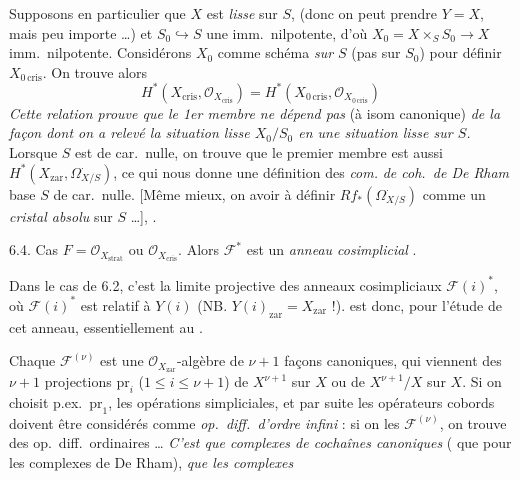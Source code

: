 \documentclass[11pt,a4paper]{article}
\begin{document}

Supposons en particulier que $X$ est \emph{lisse} sur $S$, (donc on peut
prendre $Y = X$, mais peu importe \ldots) et $S_0 \hookrightarrow S$ une
imm.\ nilpotente, d'où $X_0 = X \times_S S_0 \to X$ imm.\ nilpotente.
Considérons $X_0$ comme schéma \emph{sur $S$} (pas sur $S_0$) pour définir
$X_{0\,\mathrm{cris}}$. On trouve alors
\[
  H^{*}(X_{\mathrm{cris}}, \mathcal{O}_{X_{\mathrm{cris}}})
  = H^{*}(X_{0\,\mathrm{cris}}, \mathcal{O}_{X_{0\,\mathrm{cris}}})
\]
\emph{Cette relation prouve que le 1er membre ne dépend pas} (à isom
canonique) \emph{de la façon dont on a relevé la situation lisse
$X_0/S_0$ en une situation lisse sur $S$.} Lorsque $S$ est de car.\ nulle,
on trouve que le premier membre est aussi 
$H^{*}(X_{\mathrm{zar}}, \Omega^{\cdot}_{X/S})$, ce qui nous donne une
définition des \emph{\ill{}} \emph{com.} \emph{de coh.\ de De Rham}
 \struck{\ill{}} base $S$ de
car.\ nulle. [Même mieux, on \struck{\ill{}} \ill{} avoir à définir
$Rf_{*}(\Omega^{\cdot}_{X/S})$ comme un \emph{cristal absolu} sur $S$
\ldots], \add{\uncertain{donc} l'étendre à \emph{tt} voisinage
infinitésimal de $S$, pas seulement ceux qui \uncertain{se} rétractent sur
$S$]}.


6.4. Cas $F = \mathcal{O}_{X_{\mathrm{strat}}}$ ou
$\mathcal{O}_{X_{\mathrm{cris}}}$. Alors $\mathcal{F}^{*}$ est un
\emph{anneau cosimplicial} . 

Dans le cas de 6.2, c'est la limite projective des anneaux cosimpliciaux
$\mathcal{F}(i)^{*}$, où $\mathcal{F}(i)^{*}$ est relatif à $Y(i)$ (NB.
$Y(i)_{\mathrm{zar}} = X_{\mathrm{zar}}$ !).  est donc,
pour l'étude de cet anneau, \ill{} essentiellement au 
.

Chaque $\mathcal{F}^{(\nu)}$  est une
$\mathcal{O}_{X_{\mathrm{zar}}}$-algèbre de $\nu+1$ façons canoniques, qui
viennent des $\nu+1$ projections $\mathrm{pr}_i$ ($1 \leqslant i \leqslant
\nu+1$) de $X^{\nu+1}$ sur $X$ ou de $X^{\nu+1}/X$ sur $X$. Si on
choisit p.ex.\ $\mathrm{pr}_1$,   les opérations simpliciales,
et par suite les opérateurs cobords doivent être considérés comme
\emph{op.\ diff.\ d'ordre infini} : si on  les
$\mathcal{F}^{(\nu)}$, on trouve des op.\ diff.\ ordinaires \ldots
\emph{C'est  que complexes de cochaînes canoniques}
( que pour les complexes de De Rham), \emph{que les
complexes}
\end{document}

